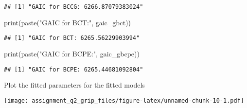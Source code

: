 \documentclass[
]{article}
\newenvironment{Shaded}{\begin{snugshade}}{\end{snugshade}}
\newcommand{\AttributeTok}[1]{\textcolor[rgb]{0.77,0.63,0.00}{#1}}
\newcommand{\CommentTok}[1]{\textcolor[rgb]{0.56,0.35,0.01}{\textit{#1}}}
\newcommand{\DecValTok}[1]{\textcolor[rgb]{0.00,0.00,0.81}{#1}}
\newcommand{\FunctionTok}[1]{\textcolor[rgb]{0.00,0.00,0.00}{#1}}
\newcommand{\NormalTok}[1]{#1}
\newcommand{\OtherTok}[1]{\textcolor[rgb]{0.56,0.35,0.01}{#1}}
\newcommand{\SpecialCharTok}[1]{\textcolor[rgb]{0.00,0.00,0.00}{#1}}
\newcommand{\StringTok}[1]{\textcolor[rgb]{0.31,0.60,0.02}{#1}}
\begin{document}
\begin{verbatim}
## [1] "GAIC for BCCG: 6266.87079383024"
\end{verbatim}

\begin{Shaded}
\begin{Highlighting}[]
\FunctionTok{print}\NormalTok{(}\FunctionTok{paste}\NormalTok{(}\StringTok{"GAIC for BCT:"}\NormalTok{, gaic\_gbct))}
\end{Highlighting}
\end{Shaded}

\begin{verbatim}
## [1] "GAIC for BCT: 6265.56229903994"
\end{verbatim}

\begin{Shaded}
\begin{Highlighting}[]
\FunctionTok{print}\NormalTok{(}\FunctionTok{paste}\NormalTok{(}\StringTok{"GAIC for BCPE:"}\NormalTok{, gaic\_gbcpe))}
\end{Highlighting}
\end{Shaded}

\begin{verbatim}
## [1] "GAIC for BCPE: 6265.44681092804"
\end{verbatim}

Plot the fitted parameters for the fitted models

\begin{Shaded}
\end{Shaded}

\texttt{[image: assignment\_q2\_grip\_files/figure-latex/unnamed-chunk-10-1.pdf]}

\begin{Shaded}
\end{Shaded}
\end{document}
